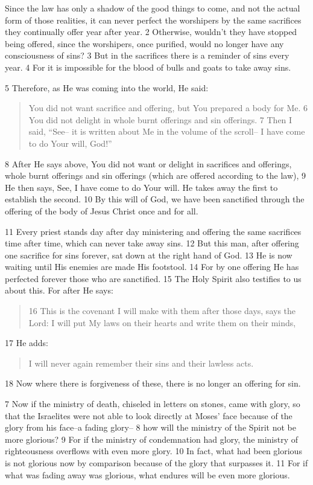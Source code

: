 \begin{bible}

Since the law has only a shadow of the good things to come, and not the actual form of those realities, it can never perfect the worshipers by the same sacrifices they continually offer year after year. 2 Otherwise, wouldn't they have stopped being offered, since the worshipers, once purified, would no longer have any consciousness of sins? 3 But in the sacrifices there is a reminder of sins every year. 4 For it is impossible for the blood of bulls and goats to take away sins.

5 Therefore, as He was coming into the world, He said:
\begin{quote}
You did not want sacrifice and offering,
but You prepared a body for Me.
6 You did not delight
in whole burnt offerings and sin offerings.
7 Then I said, ``See--
it is written about Me
in the volume of the scroll--
I have come to do Your will, God!''
\end{quote}
8 After He says above, You did not want or delight in sacrifices and offerings, whole burnt offerings and sin offerings (which are offered according to the law), 9 He then says, See, I have come to do Your will. He takes away the first to establish the second. 10 By this will of God, we have been sanctified through the offering of the body of Jesus Christ once and for all.

11 Every priest stands day after day ministering and offering the same sacrifices time after time, which can never take away sins. 12 But this man, after offering one sacrifice for sins forever, sat down at the right hand of God. 13 He is now waiting until His enemies are made His footstool. 14 For by one offering He has perfected forever those who are sanctified. 15 The Holy Spirit also testifies to us about this. For after He says:
\begin{quote}
16 This is the covenant I will make with them
after those days, says the Lord:
I will put My laws on their hearts
and write them on their minds,
\end{quote}
17 He adds:
\begin{quote}
I will never again remember
their sins and their lawless acts.
\end{quote}
18 Now where there is forgiveness of these, there is no longer an offering for sin.


7 Now if the ministry of death, chiseled in letters on stones, came with glory, so that the Israelites were not able to look directly at Moses' face because of the glory from his face--a fading glory-- 8 how will the ministry of the Spirit not be more glorious? 9 For if the ministry of condemnation had glory, the ministry of righteousness overflows with even more glory. 10 In fact, what had been glorious is not glorious now by comparison because of the glory that surpasses it. 11 For if what was fading away was glorious, what endures will be even more glorious.


\end{bible}
